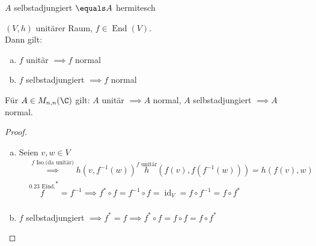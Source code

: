 \documentclass{article}
\begin{document}
    \begin{anmerkung}
        $A$ selbstadjungiert $\equals A$ hermitesch
    \end{anmerkung}
    \begin{bemerkung}
        $(V,h)$ unitärer Raum, $f\in \operatorname{End}(V)$.\\
        Dann gilt:
        \begin{enumerate}[(a)]
            \item $f$ unitär $\implies f$ normal
            \item $f$ selbstadjungiert $\implies f$ normal 
        \end{enumerate} 
        Für $A\in M_{n,n} (\C)$ gilt: $A$ unitär $\implies A$ normal, $A$ selbstadjungiert $\implies A$ normal.
    \end{bemerkung}
    \begin{proof}
        \begin{enumerate}[(a)]
            \item Seien $v,w\in V$\\
            \begin{align*}
                &\overset{f \text{ Iso.(da unitär)}}{\implies} h(v, f^{-1}(w)) \overset{\text{$f$ unitär}} h(f(v), f(f^{-1}(w))) = h(f(v), w)\\
                &\overset{\text{0.23 Eind.}} f^* = f^{-1} \implies f^* \circ f = f^{-1} \circ f = \operatorname{id}_V = f \circ f^{-1} = f \circ f^*\\
            \end{align*}
            \item $f$ selbstadjungiert $\implies f^* = f \implies f^* \circ f = f\circ f = f\circ f^*$
        \end{enumerate}
    \end{proof}
\end{document}
